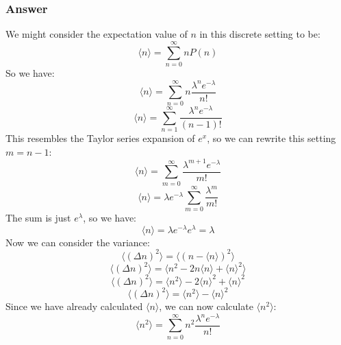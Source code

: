 \documentclass{article}
\begin{document}
\subsubsection{Answer}
We might consider the expectation value of \( n \) in this discrete setting to be:
\begin{equation}
    \langle n \rangle = \sum_{n=0}^{\infty} n P(n)
\end{equation}
So we have:
\begin{equation}
    \langle n \rangle = \sum_{n=0}^{\infty} n \frac{\lambda^n e^{-\lambda}}{n!}
\end{equation}
\begin{equation}
    \langle n \rangle = \sum_{n=1}^{\infty} \frac{\lambda^n e^{-\lambda}}{(n-1)!}
\end{equation}
This resembles the Taylor series expansion of \( e^x \), so we can rewrite this setting $m=n-1$:
\begin{equation}
    \langle n \rangle = \sum_{m=0}^{\infty} \frac{\lambda^{m+1} e^{-\lambda}}{m!}
\end{equation}
\begin{equation}
    \langle n \rangle = \lambda e^{-\lambda} \sum_{m=0}^{\infty} \frac{\lambda^m}{m!}
\end{equation}
The sum is just \( e^{\lambda} \), so we have:
\begin{equation}
    \boxed{\langle n \rangle = \lambda e^{-\lambda} e^{\lambda} = \lambda}
\end{equation}
Now we can consider the variance:
\begin{equation}
    \langle (\Delta n)^2 \rangle = \langle (n - \langle n \rangle)^2 \rangle
\end{equation}
\begin{equation}
    \langle (\Delta n)^2 \rangle = \langle n^2 - 2 n \langle n \rangle + \langle n \rangle^2 \rangle
\end{equation}
\begin{equation}
    \langle (\Delta n)^2 \rangle = \langle n^2 \rangle - 2 \langle n \rangle^2 + \langle n \rangle^2
\end{equation}
\begin{equation}
    \langle (\Delta n)^2 \rangle = \langle n^2 \rangle - \langle n \rangle^2
\end{equation}
Since we have already calculated \( \langle n \rangle \), we can now calculate \( \langle n^2 \rangle \):
\begin{equation}
    \langle n^2 \rangle = \sum_{n=0}^{\infty} n^2 \frac{\lambda^n e^{-\lambda}}{n!}
\end{equation}
\end{document}
